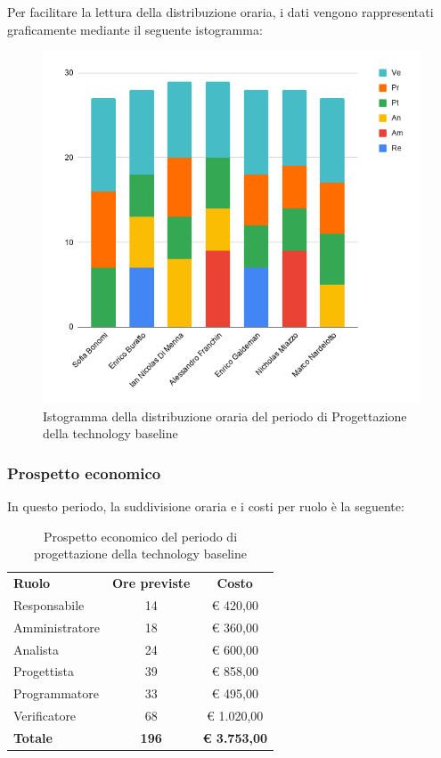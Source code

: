 \documentclass[../piano-di-progetto.tex]{subfiles}
\begin{document}
  Per facilitare la lettura della distribuzione oraria, i dati vengono rappresentati graficamente mediante il seguente istogramma:
  \begin{figure}[H]
    \centering
    \includegraphics[width=12cm]{img/ore-progettazione.png}
    \caption{Istogramma della distribuzione oraria del periodo di Progettazione della technology baseline}
    \label{fig:ore-componente-progettazione}
  \end{figure}

  \subsubsection{Prospetto economico}
  In questo periodo, la suddivisione oraria e i costi per ruolo è la seguente:

  \begin{table}[H]
    \centering
    \begin{tabular}{lcc}
      \rowcolor{lightgray}
      \textbf{Ruolo}  & \textbf{Ore previste} & \textbf{Costo}  \\
      Responsabile    & 14           & € 420,00            \\
      Amministratore  & 18           & € 360,00            \\
      Analista        & 24           & € 600,00            \\
      Progettista     & 39           & € 858,00            \\
      Programmatore   & 33           & € 495,00            \\
      Verificatore    & 68           & € 1.020,00          \\
      \textbf{Totale} & \textbf{196} & \textbf{€ 3.753,00}
    \end{tabular}
    \caption{Prospetto economico del periodo di progettazione della technology baseline}
  \end{table}
\end{document}
